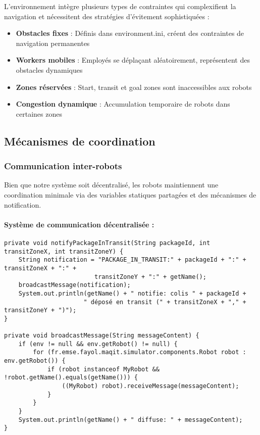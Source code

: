 \documentclass[12pt,a4paper]{article}
\begin{document}
L'environnement intègre plusieurs types de contraintes qui complexifient la navigation et nécessitent des stratégies d'évitement sophistiquées :

\begin{itemize}
    \item \textbf{Obstacles fixes} : Définis dans environment.ini, créent des contraintes de navigation permanentes
    \item \textbf{Workers mobiles} : Employés se déplaçant aléatoirement, représentent des obstacles dynamiques
    \item \textbf{Zones réservées} : Start, transit et goal zones sont inaccessibles aux robots
    \item \textbf{Congestion dynamique} : Accumulation temporaire de robots dans certaines zones
\end{itemize}

\subsection{Mécanismes de coordination}

\subsubsection{Communication inter-robots}

Bien que notre système soit décentralisé, les robots maintiennent une coordination minimale via des variables statiques partagées et des mécanismes de notification.

\paragraph{Système de communication décentralisée :}
\begin{lstlisting}[caption=Communication pour les dépôts en transit]
private void notifyPackageInTransit(String packageId, int transitZoneX, int transitZoneY) {
    String notification = "PACKAGE_IN_TRANSIT:" + packageId + ":" + transitZoneX + ":" +
                         transitZoneY + ":" + getName();
    broadcastMessage(notification);
    System.out.println(getName() + " notifie: colis " + packageId +
                      " déposé en transit (" + transitZoneX + "," + transitZoneY + ")");
}

private void broadcastMessage(String messageContent) {
    if (env != null && env.getRobot() != null) {
        for (fr.emse.fayol.maqit.simulator.components.Robot robot : env.getRobot()) {
            if (robot instanceof MyRobot && !robot.getName().equals(getName())) {
                ((MyRobot) robot).receiveMessage(messageContent);
            }
        }
    }
    System.out.println(getName() + " diffuse: " + messageContent);
}
\end{lstlisting}
\end{document}

